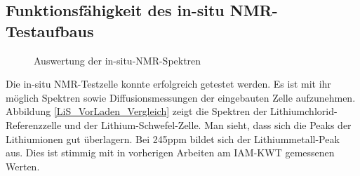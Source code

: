 \documentclass[a4paper, 11pt, headsepline,footsepline,twoside,abstract]{scrbook}
\begin{document}
\subsection{Funktionsfähigkeit des in-situ NMR-Testaufbaus}
\begin{figure}
   \centering
       \vspace{10mm}
       \vspace{6mm}
	\caption{Auswertung der in-situ-NMR-Spektren}
   	\label{insitu_nmr_auswertung}
\end{figure} 
Die in-situ NMR-Testzelle konnte erfolgreich getestet werden. Es ist mit ihr möglich Spektren sowie Diffusionsmessungen der eingebauten Zelle aufzunehmen. Abbildung \ref{LiS_VorLaden_Vergleich} zeigt die Spektren der Lithiumchlorid-Referenzzelle und der Lithium-Schwefel-Zelle. Man sieht, dass sich die Peaks der Lithiumionen gut überlagern. Bei 245\;ppm bildet sich der Lithiummetall-Peak aus. Dies ist stimmig mit in vorherigen Arbeiten am IAM-KWT gemessenen Werten.
\end{document}
